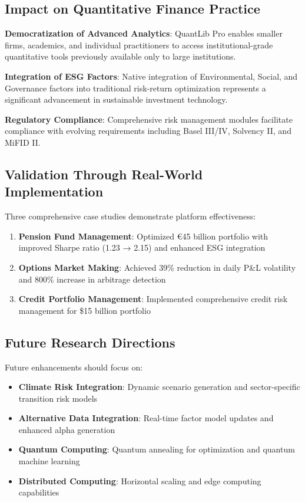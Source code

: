 \documentclass[12pt,a4paper]{article}
\theoremstyle{definition}
\theoremstyle{remark}
\begin{document}
\subsection{Impact on Quantitative Finance Practice}

\textbf{Democratization of Advanced Analytics}: QuantLib Pro enables smaller firms, academics, and individual practitioners to access institutional-grade quantitative tools previously available only to large institutions.

\textbf{Integration of ESG Factors}: Native integration of Environmental, Social, and Governance factors into traditional risk-return optimization represents a significant advancement in sustainable investment technology.

\textbf{Regulatory Compliance}: Comprehensive risk management modules facilitate compliance with evolving requirements including Basel III/IV, Solvency II, and MiFID II.

\subsection{Validation Through Real-World Implementation}

Three comprehensive case studies demonstrate platform effectiveness:
\begin{enumerate}
    \item \textbf{Pension Fund Management}: Optimized €45 billion portfolio with improved Sharpe ratio (1.23 → 2.15) and enhanced ESG integration
    \item \textbf{Options Market Making}: Achieved 39\% reduction in daily P\&L volatility and 800\% increase in arbitrage detection
    \item \textbf{Credit Portfolio Management}: Implemented comprehensive credit risk management for \$15 billion portfolio
\end{enumerate}

\subsection{Future Research Directions}

Future enhancements should focus on:
\begin{itemize}
    \item \textbf{Climate Risk Integration}: Dynamic scenario generation and sector-specific transition risk models
    \item \textbf{Alternative Data Integration}: Real-time factor model updates and enhanced alpha generation
    \item \textbf{Quantum Computing}: Quantum annealing for optimization and quantum machine learning
    \item \textbf{Distributed Computing}: Horizontal scaling and edge computing capabilities
\end{itemize}
\end{document}
